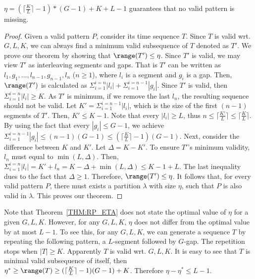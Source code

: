\begin{theorem}
\label{THM:RP_ETA}
$\eta = (\lceil \frac{K}{L} \rceil - 1)*(G-1)+K+L-1$ guarantees that no valid pattern is missing.
\end{theorem}
\begin{proof}
Given a valid pattern $P$, consider its time sequence $T$. Since $T$ is valid wrt. $G,L,K$,
we can always find a minimum valid subsequence of $T$ denoted as $T'$.
We prove our theorem by showing that $\range(T') \leq \eta$.
Since $T'$ is valid, we may view $T'$ as interleaving 
segments and gaps. That is $T'$ can be written as $l_1,g_1,\ldots,l_{n-1},g_{n-1},l_n$ ($n \geq 1$),
where $l_i$ is a segment and $g_i$ is a gap. Then, $\range(T')$
is calculated as $\Sigma_{i=1}^{i=n}|l_i| + \Sigma_{i=1}^{i=n-1} |g_i|$. Since $T'$
is valid, then $\Sigma_{i=1}^{i=n}|l_i| \geq K$. As $T'$ is minimum, if we remove the 
last $l_n$, the resulting sequence should not be valid. Let $K' = \Sigma_{i=1}^{i=n-1}|l_i|$, which
is the size of the first $(n-1)$ segments of $T'$. Then, $K' \leq K-1$.
Note that every $|l_i| \geq L$, thus $n \leq \lceil \frac{K'}{L} \rceil \leq \lceil \frac{K}{L} \rceil $. By
using the fact that every $|g_i| \leq G-1$, we achieve $\Sigma_{i=1}^{i=n-1} |g_i| \leq (n-1)(G-1)
\leq (\lceil \frac{K}{L} \rceil -1)(G-1)$. Next, consider the difference between $K$ and $K'$. Let 
$\Delta = K- K'$. To ensure $T'$'s minimum validity, $l_n$ must equal to $\min(L, \Delta)$.
Then, $\Sigma_{i=1}^{i=n}|l_i| = K' + l_n = K - \Delta + \min(L, \Delta) \leq K - 1 + L$. The last
inequality dues to the fact that $\Delta \geq 1$.
Therefore, $\range(T') \leq \eta$. It follows that, for every valid pattern $P$, there must
exists a partition $\lambda$ with size $\eta$, such that $P$ is also valid in $\lambda$. This proves our theorem.
\end{proof}

Note that Theorem~\ref{THM:RP_ETA} does not state the optimal value of $\eta$
for a given $G,L,K$. However, for any $G,L,K$, $\eta$ does not differ from
the optimal value by at most $L-1$. To see this, for any $G,L,K$, we can
generate a sequence $T$ by repeating the following pattern, a $L$-segment followed by $G$-gap. 
The repetition stops when $|T|\geq K$. Apparently $T$ is valid wrt. $G,L,K$.
It is easy to see that $T$ is minimal valid subsequence of itself, then $\eta^*  \geq \range(T) \geq (\lceil \frac{K}{L}\rceil -1)(G-1) + K$.
Therefore $\eta-\eta^* \leq L-1$.


